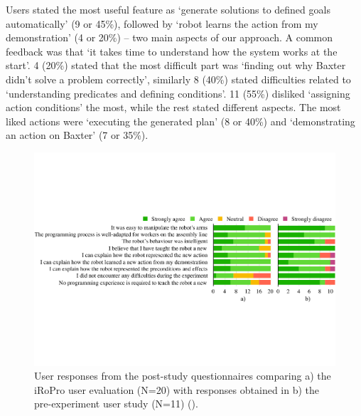 Users stated the most useful feature as `generate solutions to defined goals automatically' (9 or 45\%), followed by `robot learns the action from my demonstration' (4 or 20\%) -- two main aspects of our approach.
A common feedback was that `it takes time to understand how the system works at the start'.
4 (20\%) stated that the most difficult part was `finding out why Baxter didn't solve a problem correctly', similarly 8 (40\%) stated difficulties related to `understanding predicates and defining conditions'. 
11 (55\%) disliked `assigning action conditions' the most, while the rest stated different aspects.
The most liked actions were `executing the generated plan' (8 or 40\%) and `demonstrating an action on Baxter' (7 or 35\%).

\begin{figure}
	\includegraphics[width=0.98\linewidth]{figures/quan-exp1vsexp2-results.pdf}
	\caption{User responses from the post-study questionnaires comparing a) the iRoPro user evaluation (N=20) with responses obtained in b) the pre-experiment user study (N=11) ().}
	\label{fig:exp1vsexp2-results}
\end{figure}


